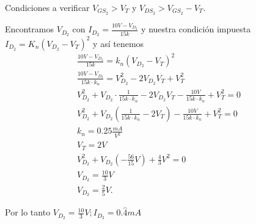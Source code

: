 \documentclass[12pt]{exam}
\begin{document}
    Condiciones a verificar $V_{GS_2}>V_T$ y $V_{DS_2} > V_{GS_2} - V_T$.

    Encontramos $V_{D_2}$ con $I_{D_2} = \frac{10V - V_{D_2}}{15k}$ y nuestra condición impuesta $I_{D_2} = K_n\left( V_{D_2} - V_T \right)^2$ y así tenemos 
    \begin{align*}
      \frac{10V - V_{D_2}}{15k} = k_n \left( V_{D_2} - V_T \right)^2\\
      \frac{10V - V_{D_2}}{15k \cdot k_n} = V_{D_2}^2 - 2V_{D_2}V_T + V_T^2\\
      V_{D_2}^2 + V_{D_2}\cdot \frac{1}{15k \cdot k_n} - 2 V_{D_2}V_T - \frac{10V}{15k\cdot k_n} + V_{T}^2 = 0\\
      V_{D_2}^2 + V_{D_2}\left( \frac{1}{15k \cdot k_n} - 2V_T \right) - \frac{10V}{15k \cdot k_n} + V_T^2 = 0\\
      k_n = 0.25 \frac{mA}{V^2}\\
      V_T = 2V\\
      V_{D_2}^2 + V_{D_{2}}\left( - \frac{56}{15}V \right) + \frac{4}{3}V^2 = 0\\
      V_{D_2} = \frac{10}{3}V\\
      V_{D_2} = \frac{2}{5}V
    .\end{align*}

    Por lo tanto $V_{D_2} = \frac{10}{3}V; I_{D_2} = 0.\hat{4}mA$
\end{document}
